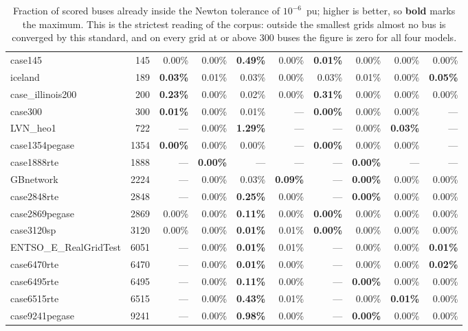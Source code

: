 \documentclass[10pt]{article}
\begin{document}
\begin{table}[H]
\begin{tabular}{lr rrrr rrrr}
case145 & 145 & 0.00\% & 0.00\% & \textbf{0.49\%} & 0.00\% & \textbf{0.01\%} & 0.00\% & 0.00\% & 0.00\% \\
iceland & 189 & \textbf{0.03\%} & 0.01\% & 0.03\% & 0.00\% & 0.03\% & 0.01\% & 0.00\% & \textbf{0.05\%} \\
case\_illinois200 & 200 & \textbf{0.23\%} & 0.00\% & 0.02\% & 0.00\% & \textbf{0.31\%} & 0.00\% & 0.00\% & 0.00\% \\
case300 & 300 & \textbf{0.01\%} & 0.00\% & 0.01\% & --- & \textbf{0.00\%} & 0.00\% & 0.00\% & --- \\
LVN\_heo1 & 722 & --- & 0.00\% & \textbf{1.29\%} & --- & --- & 0.00\% & \textbf{0.03\%} & --- \\
case1354pegase & 1354 & \textbf{0.00\%} & 0.00\% & 0.00\% & --- & \textbf{0.00\%} & 0.00\% & 0.00\% & --- \\
case1888rte & 1888 & --- & \textbf{0.00\%} & --- & --- & --- & \textbf{0.00\%} & --- & --- \\
GBnetwork & 2224 & --- & 0.00\% & 0.03\% & \textbf{0.09\%} & --- & \textbf{0.00\%} & 0.00\% & 0.00\% \\
case2848rte & 2848 & --- & 0.00\% & \textbf{0.25\%} & 0.00\% & --- & \textbf{0.00\%} & 0.00\% & 0.00\% \\
case2869pegase & 2869 & 0.00\% & 0.00\% & \textbf{0.11\%} & 0.00\% & \textbf{0.00\%} & 0.00\% & 0.00\% & 0.00\% \\
case3120sp & 3120 & 0.00\% & 0.00\% & \textbf{0.01\%} & 0.01\% & \textbf{0.00\%} & 0.00\% & 0.00\% & 0.00\% \\
ENTSO\_E\_RealGridTest & 6051 & --- & 0.00\% & \textbf{0.01\%} & 0.01\% & --- & 0.00\% & 0.00\% & \textbf{0.01\%} \\
case6470rte & 6470 & --- & 0.00\% & \textbf{0.01\%} & 0.00\% & --- & 0.00\% & 0.00\% & \textbf{0.02\%} \\
case6495rte & 6495 & --- & 0.00\% & \textbf{0.11\%} & 0.00\% & --- & \textbf{0.00\%} & 0.00\% & 0.00\% \\
case6515rte & 6515 & --- & 0.00\% & \textbf{0.43\%} & 0.01\% & --- & 0.00\% & \textbf{0.01\%} & 0.00\% \\
case9241pegase & 9241 & --- & 0.00\% & \textbf{0.98\%} & 0.00\% & --- & \textbf{0.00\%} & 0.00\% & 0.00\% \\
\bottomrule
\end{tabular}
\caption{Fraction of scored buses already inside the Newton tolerance of
$10^{-6}$~pu; higher is better, so \textbf{bold} marks the maximum. This is the
strictest reading of the corpus: outside the smallest grids almost no bus is
converged by this standard, and on every grid at or above 300 buses the figure
is zero for all four models.}
\end{table}
\end{document}
